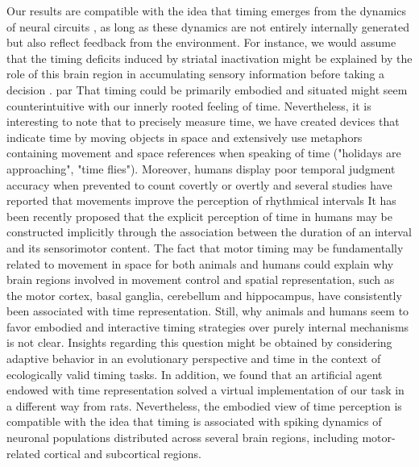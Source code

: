 Our results are compatible with the idea that timing emerges from the dynamics of neural circuits \cite{Paton2018Neuron,Goel2014PhilTrans}, as long as these dynamics are not entirely internally generated but also reflect feedback from the environment.
For instance, we would assume that the timing deficits induced by striatal inactivation \cite{Rueda2015NatNeuro} might be explained by the role of this brain region in accumulating sensory information before taking a decision \cite{Yartsev2018eLife,Dunovan2016FrontNeuro}.
par
That timing could be primarily embodied and situated might seem counterintuitive with our innerly rooted feeling of time.
Nevertheless, it is interesting to note that to precisely measure time, we have created devices that indicate time by moving objects in space and extensively use metaphors containing movement and space references when speaking of time ("holidays are approaching", "time flies")\cite{Nunez2013TICS,Winter2015Cortex}.
Moreover, humans display poor temporal judgment accuracy when prevented to count covertly or overtly\cite{Rattat2012} and several studies have reported that movements improve the perception of rhythmical intervals\cite{Su2012,Manning2013,Wiener2019eNeuro}
It has been recently proposed that the explicit perception of time in humans may be constructed implicitly through the association between the duration of an interval and its sensorimotor content\cite{Coull2018TICS}.
The fact that motor timing may be fundamentally related to movement in space for both animals and humans could explain why brain regions involved in movement control and spatial representation, such as the motor cortex, basal ganglia, cerebellum and hippocampus, have consistently been associated with time representation\cite{pouthas2005HumBrainMapp, Kraus2013Neuron, Bakhurin2017JNeurosci, Morillon2017PNAS, Gu2018NeurobLearnMem, Mello2015CurBio, Villette2015, Pastalkova2008, Schubotz2000}.
Still, why animals and humans seem to favor embodied and interactive timing strategies over purely internal mechanisms is not clear.
Insights regarding this question might be obtained by considering adaptive behavior in an evolutionary perspective\cite{Cisek2019} and time in the context of ecologically valid timing tasks\cite{vanRijn2018}.
In addition, we found that an artificial agent endowed with time representation solved a virtual implementation of our task in a different way from rats.
Nevertheless, the embodied view of time perception is compatible with the idea that timing is associated with spiking dynamics of neuronal populations distributed across several brain regions, including motor-related cortical and subcortical regions\cite{Paton2018Neuron,Goel2014PhilTrans}.
